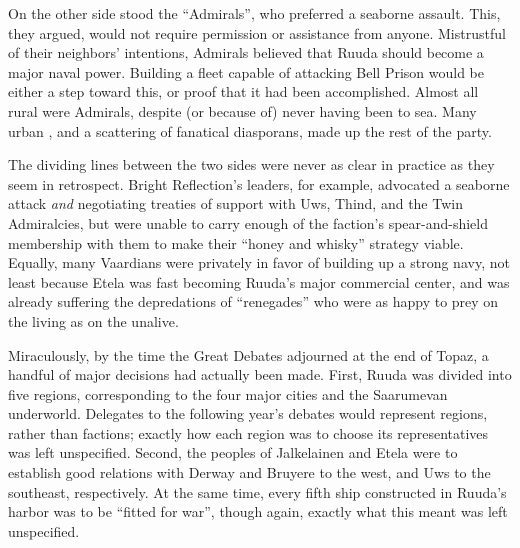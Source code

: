 \documentclass[12pt]{report}
\begin{document}
On the other side stood the ``Admirals'', who preferred a seaborne
assault.  This, they argued, would not require permission or
assistance from anyone.  Mistrustful of their neighbors' intentions,
Admirals believed that Ruuda should become a major naval power.
Building a fleet capable of attacking Bell Prison would be either a
step toward this, or proof that it had been accomplished.  Almost all
rural {\aemott} were Admirals, despite (or because of) never having
been to sea.  Many urban {\aemott}, and a scattering of fanatical
diasporans, made up the rest of the party.

The dividing lines between the two sides were never as clear in
practice as they seem in retrospect.  Bright Reflection's leaders, for
example, advocated a seaborne attack \emph{and} negotiating treaties
of support with Uws, Thind, and the Twin Admiralcies, but were unable
to carry enough of the faction's spear-and-shield membership with them
to make their ``honey and whisky'' strategy viable.  Equally, many
Vaardians were privately in favor of building up a strong navy, not
least because Etela was fast becoming Ruuda's major commercial center,
and was already suffering the depredations of ``renegades'' who were as
happy to prey on the living as on the unalive.

Miraculously, by the time the Great Debates adjourned at the end of
Topaz, a handful of major decisions had actually been made.  First,
Ruuda was divided into five regions, corresponding to the four major
cities and the Saarumevan underworld.  Delegates to the following
year's debates would represent regions, rather than factions; exactly
how each region was to choose its representatives was left
unspecified.  Second, the peoples of Jalkelainen and Etela were to
establish good relations with Derway and Bruyere to the west, and Uws
to the southeast, respectively.  At the same time, every fifth ship
constructed in Ruuda's harbor was to be ``fitted for war'', though
again, exactly what this meant was left unspecified.
\end{document}
